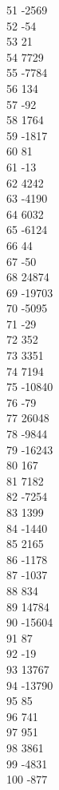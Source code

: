 { 51	-2569 \\
 52	-54 \\
 53	21 \\
 54	7729 \\
 55	-7784 \\
 56	134 \\
 57	-92 \\
 58	1764 \\
 59	-1817 \\
 60	81 \\
 61	-13 \\
 62	4242 \\
 63	-4190 \\
 64	6032 \\
 65	-6124 \\
 66	44 \\
 67	-50 \\
 68	24874 \\
 69	-19703 \\
 70	-5095 \\
 71	-29 \\
 72	352 \\
 73	3351 \\
 74	7194 \\
 75	-10840 \\
 76	-79 \\
 77	26048 \\
 78	-9844 \\
 79	-16243 \\
 80	167 \\
 81	7182 \\
 82	-7254 \\
 83	1399 \\
 84	-1440 \\
 85	2165 \\
 86	-1178 \\
 87	-1037 \\
 88	834 \\
 89	14784 \\
 90	-15604 \\
 91	87 \\
 92	-19 \\
 93	13767 \\
 94	-13790 \\
 95	85 \\
 96	741 \\
 97	951 \\
 98	3861 \\
 99	-4831 \\
 100	-877 \\
}

